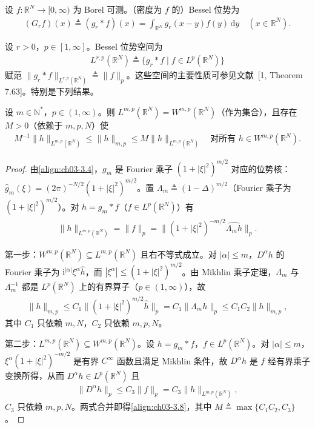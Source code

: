 \documentclass[../../main.tex]{subfiles}%
\begin{document}
设 $f:\mathbb{R}^N\to[0,\infty)$ 为 Borel 可测。（密度为 $f$ 的）Bessel 位势为
\begin{align}
(G_rf)(x)\triangleq (g_r*f)(x)=\int_{\mathbb{R}^N}g_r(x-y)f(y)\,\mathrm{d}y
\quad (x\in\mathbb{R}^N).\label{align:ch03-3.7}
\end{align}

设 $r>0$，$p\in[1,\infty]$。Bessel 位势空间为
\begin{align*}
L^{r,p}(\mathbb{R}^N)\triangleq \{g_r*f\mid f\in L^p(\mathbb{R}^N)\}
\end{align*}
赋范 $\|g_r*f\|_{L^{r,p}(\mathbb{R}^N)}\triangleq \|f\|_p$。这些空间的主要性质可参见文献~[1, Theorem 7.63]。特别是下列结果。

\begin{theorem}[Calder\'on]\label{theorem:ch03-Calderon}
设 $m\in\mathbb{N}^*$，$p\in(1,\infty)$。则 $L^{m,p}(\mathbb{R}^N)=W^{m,p}(\mathbb{R}^N)$（作为集合），且存在 $M>0$（依赖于 $m,p,N$）使
\begin{align}
M^{-1}\|h\|_{L^{m,p}(\mathbb{R}^N)}\leqslant\|h\|_{m,p}\leqslant M\|h\|_{L^{m,p}(\mathbb{R}^N)}
\quad \text{对所有 }h\in W^{m,p}(\mathbb{R}^N).\label{align:ch03-3.8}
\end{align}
\end{theorem}

\begin{proof}
由\eqref{align:ch03-3.4}，$g_m$ 是 Fourier 乘子 $(1+|\xi|^2)^{m/2}$ 对应的位势核：$\widehat g_m(\xi)=(2\pi)^{-N/2}(1+|\xi|^2)^{m/2}$。置 $\Lambda_m\triangleq(1-\Delta)^{m/2}$（Fourier 乘子为 $(1+|\xi|^2)^{m/2}$）。对 $h=g_m*f$（$f\in L^p(\mathbb{R}^N)$）有
\begin{align*}
\|h\|_{L^{m,p}(\mathbb{R}^N)}=\|f\|_p=\big\|(1+|\xi|^2)^{-m/2}\widehat{\Lambda_mh}\big\|_p.
\end{align*}

第一步：$W^{m,p}(\mathbb{R}^N)\subseteq L^{m,p}(\mathbb{R}^N)$ 且右不等式成立。对 $|\alpha|\leqslant m$，$D^\alpha h$ 的 Fourier 乘子为 $\mathrm{i}^{|\alpha|}\xi^\alpha\widehat h$，而 $|\xi^\alpha|\leqslant(1+|\xi|^2)^{m/2}$。由 Mikhlin 乘子定理，$\Lambda_m$ 与 $\Lambda_m^{-1}$ 都是 $L^p(\mathbb{R}^N)$ 上的有界算子（$p\in(1,\infty)$），故
\begin{align*}
\|h\|_{m,p}\leqslant C_1\big\|(1+|\xi|^2)^{m/2}\widehat h\big\|_p=C_1\|\Lambda_mh\|_p\leqslant C_1C_2\|h\|_{m,p},
\end{align*}
其中 $C_1$ 只依赖 $m,N$，$C_2$ 只依赖 $m,p,N$。

第二步：$L^{m,p}(\mathbb{R}^N)\subseteq W^{m,p}(\mathbb{R}^N)$。设 $h=g_m*f$，$f\in L^p(\mathbb{R}^N)$。对 $|\alpha|\leqslant m$，$\xi^\alpha(1+|\xi|^2)^{-m/2}$ 是有界 $C^\infty$ 函数且满足 Mikhlin 条件，故 $D^\alpha h$ 是 $f$ 经有界乘子变换所得，从而 $D^\alpha h\in L^p(\mathbb{R}^N)$ 且
\begin{align*}
\|D^\alpha h\|_p\leqslant C_3\|f\|_p=C_3\|h\|_{L^{m,p}(\mathbb{R}^N)},
\end{align*}
$C_3$ 只依赖 $m,p,N$。两式合并即得\eqref{align:ch03-3.8}，其中 $M\triangleq\max\{C_1C_2,C_3\}$。
\end{proof}
\end{document}
